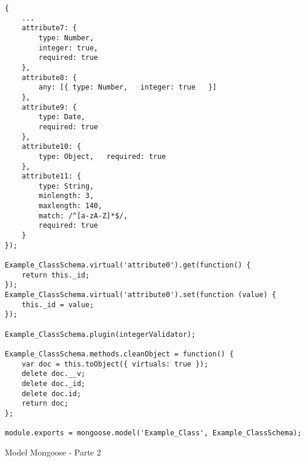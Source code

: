 \begin{anexosenv}
\begin{listing}
\begin{verbatim}
{
    ...
    attribute7: {
        type: Number,
        integer: true,
        required: true
    },
    attribute8: {
        any: [{ type: Number,   integer: true   }]
    },
    attribute9: {
        type: Date,
        required: true
    },
    attribute10: {
        type: Object,   required: true
    },
    attribute11: {
        type: String,
        minlength: 3,
        maxlength: 140,
        match: /^[a-zA-Z]*$/,
        required: true
    }
});

Example_ClassSchema.virtual('attribute0').get(function() {
    return this._id;
});
Example_ClassSchema.virtual('attribute0').set(function (value) {
    this._id = value;
});

Example_ClassSchema.plugin(integerValidator);

Example_ClassSchema.methods.cleanObject = function() {
    var doc = this.toObject({ virtuals: true });
    delete doc.__v;
    delete doc._id;
    delete doc.id;
    return doc;
};

module.exports = mongoose.model('Example_Class', Example_ClassSchema);

\end{verbatim}
\caption{Model Mongoose - Parte 2}
\end{listing}

\end{anexosenv}